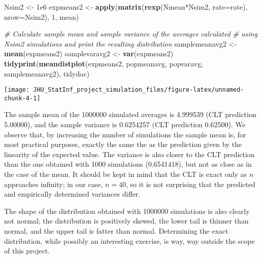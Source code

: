 \documentclass[12pt,a4paper]{article}
\newenvironment{Shaded}{\begin{snugshade}}{\end{snugshade}}
\newcommand{\KeywordTok}[1]{\textcolor[rgb]{0.13,0.29,0.53}{\textbf{{#1}}}}
\newcommand{\DataTypeTok}[1]{\textcolor[rgb]{0.13,0.29,0.53}{{#1}}}
\newcommand{\DecValTok}[1]{\textcolor[rgb]{0.00,0.00,0.81}{{#1}}}
\newcommand{\FloatTok}[1]{\textcolor[rgb]{0.00,0.00,0.81}{{#1}}}
\newcommand{\StringTok}[1]{\textcolor[rgb]{0.31,0.60,0.02}{{#1}}}
\newcommand{\CommentTok}[1]{\textcolor[rgb]{0.56,0.35,0.01}{\textit{{#1}}}}
\newcommand{\NormalTok}[1]{{#1}}
\begin{document}
\begin{Shaded}
\begin{Highlighting}[]
\NormalTok{Nsim2 <-}\StringTok{ }\FloatTok{1e6}
\NormalTok{expmeans2 <-}\StringTok{ }\KeywordTok{apply}\NormalTok{(}\KeywordTok{matrix}\NormalTok{(}\KeywordTok{rexp}\NormalTok{(Nmean*Nsim2, }\DataTypeTok{rate=}\NormalTok{rate), }\DataTypeTok{nrow=}\NormalTok{Nsim2),}
                   \DecValTok{1}\NormalTok{, mean)}
\end{Highlighting}
\end{Shaded}

\begin{Shaded}
\begin{Highlighting}[]
\CommentTok{# Calculate sample mean and sample variance of the averages calculated}
\CommentTok{# using Nsim2 simulations and print the resulting distribution}
\NormalTok{samplemeanavg2 <-}\StringTok{ }\KeywordTok{mean}\NormalTok{(expmeans2)}
\NormalTok{samplevaravg2 <-}\StringTok{ }\KeywordTok{var}\NormalTok{(expmeans2)}
\KeywordTok{tidyprint}\NormalTok{(}\KeywordTok{meandistplot}\NormalTok{(expmeans2, popmeanavg, popvaravg, samplemeanavg2),}
          \NormalTok{tidydoc)}
\end{Highlighting}
\end{Shaded}

\begin{center}\texttt{[image: JHU\_StatInf\_project\_simulation\_files/figure-latex/unnamed-chunk-4-1]} \end{center}

The sample mean of the 1000000 simulated averages is 4.999539 (CLT
prediction 5.00000), and the sample variance is 0.6254257 (CLT
prediction 0.62500). We observe that, by increasing the number of
simulations the sample mean is, for most practical purposes, exactly the
same the as the prediction given by the linearity of the expected value.
The variance is also closer to the CLT prediction than the one obtained
with 1000 simulations (0.6541418), but not as close as in the case of
the mean. It should be kept in mind that the CLT is exact only as \(n\)
approaches infinity; in our case, \(n = 40\), so it is not surprising
that the predicted and empirically determined variances differ.

The shape of the distribution obtained with 1000000 simulations is also
clearly not normal; the distribution is positively skewed, the lower
tail is thinner than normal, and the upper tail is fatter than normal.
Determining the exact distribution, while possibly an interesting
exercise, is way, way outside the scope of this project.
\end{document}
